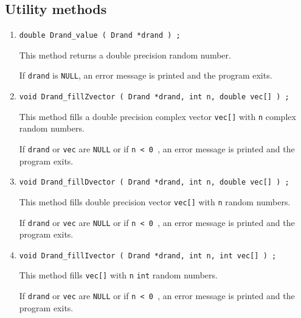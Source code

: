 \subsection{Utility methods}
\label{subsection:Drand:proto:utilities}
\par
\begin{enumerate}
\item
\begin{verbatim}
double Drand_value ( Drand *drand ) ;
\end{verbatim}
This method returns a double precision random number.
\par {}
If {\tt drand} is {\tt NULL},
an error message is printed and the program exits.
\item
\begin{verbatim}
void Drand_fillZvector ( Drand *drand, int n, double vec[] ) ;
\end{verbatim}
This method fills a double precision complex vector {\tt vec[]} 
with {\tt n} complex random numbers.
\par {}
If {\tt drand} or {\tt vec} are {\tt NULL} or if {\tt n < 0 },
an error message is printed and the program exits.
\item
\begin{verbatim}
void Drand_fillDvector ( Drand *drand, int n, double vec[] ) ;
\end{verbatim}
This method fills double precision vector {\tt vec[]} 
with {\tt n} random numbers.
\par {}
If {\tt drand} or {\tt vec} are {\tt NULL} or if {\tt n < 0 },
an error message is printed and the program exits.
\item
\begin{verbatim}
void Drand_fillIvector ( Drand *drand, int n, int vec[] ) ;
\end{verbatim}
This method fills {\tt vec[]} with {\tt n} {\tt int} random numbers.
\par {}
If {\tt drand} or {\tt vec} are {\tt NULL} or if {\tt n < 0 },
an error message is printed and the program exits.
\end{enumerate}
